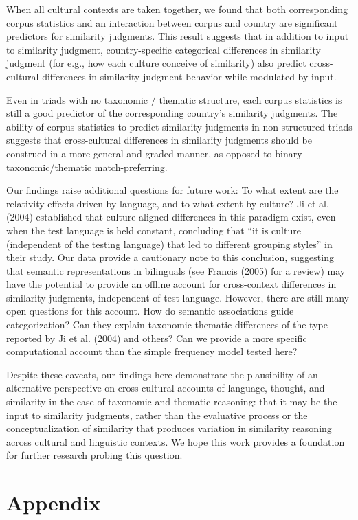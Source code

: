 \documentclass[10pt, letterpaper]{article}
\begin{document}
When all cultural contexts are taken together, we found that both
corresponding corpus statistics and an interaction between corpus and
country are significant predictors for similarity judgments. This result
suggests that in addition to input to similarity judgment,
country-specific categorical differences in similarity judgment (for
e.g., how each culture conceive of similarity) also predict
cross-cultural differences in similarity judgment behavior while
modulated by input.

Even in triads with no taxonomic / thematic structure, each corpus
statistics is still a good predictor of the corresponding country's
similarity judgments. The ability of corpus statistics to predict
similarity judgments in non-structured triads suggests that
cross-cultural differences in similarity judgments should be construed
in a more general and graded manner, as opposed to binary
taxonomic/thematic match-preferring.

Our findings raise additional questions for future work: To what extent
are the relativity effects driven by language, and to what extent by
culture? Ji et al. (2004) established that culture-aligned differences
in this paradigm exist, even when the test language is held constant,
concluding that ``it is culture (independent of the testing language)
that led to different grouping styles'' in their study. Our data provide
a cautionary note to this conclusion, suggesting that semantic
representations in bilinguals (see Francis (2005) for a review) may have
the potential to provide an offline account for cross-context
differences in similarity judgments, independent of test language.
However, there are still many open questions for this account. How do
semantic associations guide categorization? Can they explain
taxonomic-thematic differences of the type reported by Ji et al. (2004)
and others? Can we provide a more specific computational account than
the simple frequency model tested here?

Despite these caveats, our findings here demonstrate the plausibility of
an alternative perspective on cross-cultural accounts of language,
thought, and similarity in the case of taxonomic and thematic reasoning:
that it may be the input to similarity judgments, rather than the
evaluative process or the conceptualization of similarity that produces
variation in similarity reasoning across cultural and linguistic
contexts. We hope this work provides a foundation for further research
probing this question.

\hypertarget{appendix}{%
\section{Appendix}\label{appendix}}
\end{document}
